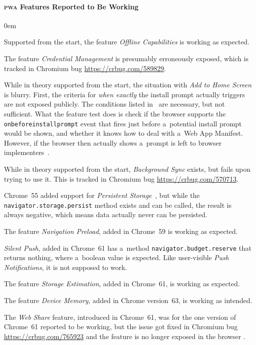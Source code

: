 \documentclass[sigconf,hyphens]{acmart}
\begin{document}
\paragraph{\textsc{pwa} Features Reported to Be Working}

\begin{description}
  \itemsep0em 
  \item[Offline Capabilities] Supported from the start, the feature \emph{Offline Capabilities}
    is working as expected.
  \item[Credential Management] The feature \emph{Credential Management}
    is presumably erroneously exposed,
     which is tracked in Chromium bug \url{https://crbug.com/589829}.    
  \item[Add to Home Screen] While in theory supported from the start,
    the situation with \emph{Add to Home Screen} is blurry.
    First, the criteria for \emph{when exactly} the install prompt actually triggers
    are not exposed publicly. The conditions listed in~\cite{kinlan2017a2hs} are necessary,
    but not sufficient.
    What the feature test does is check if the browser supports the \texttt{onbeforeinstallprompt} event
    that fires just before a~potential install prompt would be shown,
    and whether it knows how to deal
    with a~Web App Manifest.
    However, if the browser then actually shows a~prompt
    is left to browser implementers~\cite{caceres2017manifest}.
  \item[Background Sync] While in theory supported from the start,
    \emph{Background Sync} exists, but fails upon trying to use it.
    This is tracked in Chromium bug \url{https://crbug.com/570713}.
  \item[Persistent Storage] Chrome~55 added support for
     \emph{Persistent Storage}~\cite{vankesteren2018storage},
     but while the \texttt{navigator.storage.persist} method exists and can be called,
     the result is always negative, which means data actually never can be persisted.
  \item[Navigation Preload] The feature \emph{Navigation Preload}, added in Chrome~59
    is working as expected.
  \item[Silent Push] \emph{Silent Push}, added in Chrome~61 has a~method
    \texttt{navigator.budget.reserve} that returns nothing, where a~boolean value is expected.
    Like user-visible \emph{Push Notifications}, it is not supposed to work.
  \item[Storage Estimation] The feature \emph{Storage Estimation}, added in Chrome~61,
    is working as expected.
  \item[Device Memory] The feature \emph{Device Memory}, added in Chrome version~63, 
    is working as intended.
  \item[Web Share] The \emph{Web Share} feature, introduced in Chrome~61,
    was for the one version of Chrome~61 reported to be working, but the issue got fixed
    in Chromium bug \url{https://crbug.com/765923} and the feature is no longer exposed in the browser .
\end{description} 
\end{document}
